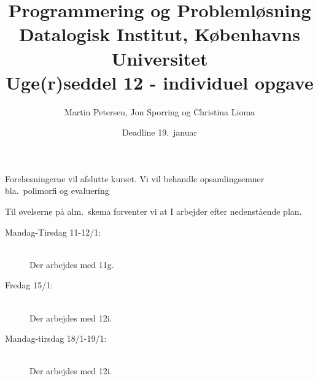 \documentclass[a4paper,12pt]{article}
\title{Programmering og Problemløsning\\Datalogisk Institut,
  Københavns Universitet\\Uge(r)seddel 12 - individuel opgave}
\author{Martin Petersen, Jon Sporring og Christina Lioma}
\date{Deadline  19.\ januar}
\begin{document}
\maketitle

Forelæsningerne vil afslutte kurset. Vi vil behandle opsamlingsemner
bla.\ polimorfi og evaluering

Til øvelserne på alm.\ skema forventer vi at I arbejder efter nedenstående plan.
\begin{description}
\item[Mandag-Tirsdag 11-12/1:]~\\[0cm] 
  Der arbejdes med 11g.
\item[Fredag 15/1:]~\\[0cm] 
  Der arbejdes med 12i.
\item[Mandag-tirsdag 18/1-19/1:]~\\[0cm] 
  Der arbejdes med 12i.
\end{description}
\end{document}
